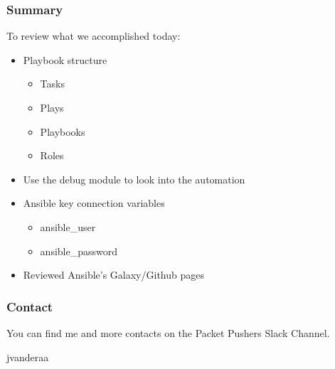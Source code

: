\documentclass{beamer}
\begin{document}
\begin{frame}
  \frametitle{Summary}
    To review what we accomplished today:
    \begin{itemize}
      \item <1-> Playbook structure
      \begin{itemize}
        \item <2-> Tasks
        \item <2-> Plays
        \item <2-> Playbooks
        \item <2-> Roles
      \end{itemize}
      \item <3-> Use the debug module to look into the automation
      \item <4-> Ansible key connection variables
      \begin{itemize}
        \item <5-> ansible\_user
        \item <5-> ansible\_password
      \end{itemize}
      \item <6-> Reviewed Ansible's Galaxy/Github pages
    \end{itemize}
\end{frame}

\begin{frame}
  \frametitle{Contact}
  \huge
  You can find me and more contacts on the Packet Pushers Slack Channel. 
  \linebreak
  \begin{center}
    \normalsize
    \faSlack \hspace{.1cm}jvanderaa  
  \end{center}
  
\end{frame}
\end{document}
